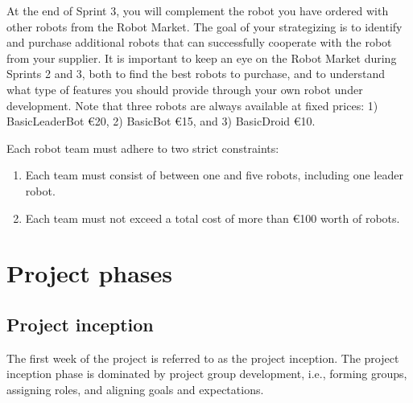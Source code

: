 \documentclass{scrreprt}
\begin{document}
At the end of Sprint 3, you will complement the robot you have ordered with other robots from the Robot Market. The goal of your strategizing is to identify and purchase additional robots that can successfully cooperate with the robot from your supplier. It is important to keep an eye on the Robot Market during Sprints 2 and 3, both to find the best robots to purchase, and to understand what type of features you should provide through your own robot under development. Note that three robots are always available at fixed prices: 1) BasicLeaderBot \euro 20, 2) BasicBot \euro 15, and 3) BasicDroid \euro 10.

Each robot team must adhere to two strict constraints: 

\begin{enumerate}
\item Each team must consist of between one and five robots, including one leader robot.
\item Each team must not exceed a total cost of more than \euro 100 worth of robots.
\end{enumerate}

\chapter{Project phases}

\section{Project inception}
The first week of the project is referred to as the project inception. The project inception phase is dominated by project group development, i.e., forming groups, assigning roles, and aligning goals and expectations.
\end{document}
